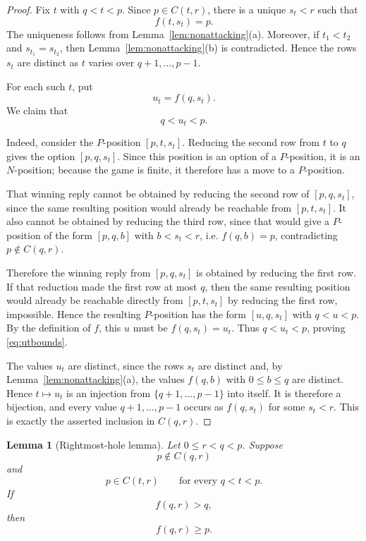 \documentclass[11pt]{article}
\newtheorem{lemma}[theorem]{Lemma}
\begin{document}
\begin{proof}
Fix $t$ with $q<t<p$. Since $p\in C(t,r)$, there is a unique $s_t<r$ such
that
\[
        f(t,s_t)=p.
\]
The uniqueness follows from Lemma~\ref{lem:nonattacking}(a). Moreover, if
$t_1<t_2$ and $s_{t_1}=s_{t_2}$, then Lemma~\ref{lem:nonattacking}(b) is
contradicted. Hence the rows $s_t$ are distinct as $t$ varies over
$q+1,\ldots,p-1$.

For each such $t$, put
\[
        u_t=f(q,s_t).
\]
We claim that
\begin{equation}\label{eq:utbounds}
        q<u_t<p.
\end{equation}

Indeed, consider the $P$-position $[p,t,s_t]$. Reducing the second row from
$t$ to $q$ gives the option $[p,q,s_t]$. Since this position is an option of a
$P$-position, it is an $N$-position; because the game is finite, it therefore
has a move to a $P$-position.

That winning reply cannot be obtained by reducing the second row of
$[p,q,s_t]$, since the same resulting position would already be reachable from
$[p,t,s_t]$. It also cannot be obtained by reducing the third row, since that
would give a $P$-position of the form $[p,q,b]$ with $b<s_t<r$, i.e.
$f(q,b)=p$, contradicting $p\notin C(q,r)$.

Therefore the winning reply from $[p,q,s_t]$ is obtained by reducing the first
row. If that reduction made the first row at most $q$, then the same resulting
position would already be reachable directly from $[p,t,s_t]$ by reducing the
first row, impossible. Hence the resulting $P$-position has the form
$[u,q,s_t]$ with $q<u<p$. By the definition of $f$, this $u$ must be
$f(q,s_t)=u_t$. Thus $q<u_t<p$, proving \eqref{eq:utbounds}.

The values $u_t$ are distinct, since the rows $s_t$ are distinct and,
by Lemma~\ref{lem:nonattacking}(a), the values $f(q,b)$ with $0\le b\le q$
are distinct. Hence
$t\mapsto u_t$ is an injection from $\{q+1,\ldots,p-1\}$ into itself. It is
therefore a bijection, and every value $q+1,\ldots,p-1$ occurs as $f(q,s_t)$
for some $s_t<r$. This is exactly the asserted inclusion in $C(q,r)$.
\end{proof}

\begin{lemma}[Rightmost-hole lemma]\label{lem:rightmosthole}
Let $0\le r<q<p$. Suppose
\[
        p\notin C(q,r)
\]
and
\[
        p\in C(t,r)\qquad\text{for every } q<t<p.
\]
If
\[
        f(q,r)>q,
\]
then
\[
        f(q,r)\ge p.
\]
\end{lemma}
\end{document}
